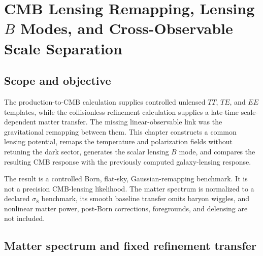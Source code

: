\chapter{CMB Lensing Remapping, Lensing \texorpdfstring{$B$}{B} Modes, and Cross-Observable Scale Separation}
\label{ch:cmb-lensing-remapping}

\section{Scope and objective}

The production-to-CMB calculation supplies controlled unlensed $TT$, $TE$, and $EE$ templates, while the collisionless refinement calculation supplies a late-time scale-dependent matter transfer.  The missing linear-observable link was the gravitational remapping between them.  This chapter constructs a common lensing potential, remaps the temperature and polarization fields without retuning the dark sector, generates the scalar lensing $B$ mode, and compares the resulting CMB response with the previously computed galaxy-lensing response.

The result is a controlled Born, flat-sky, Gaussian-remapping benchmark.  It is not a precision CMB-lensing likelihood.  The matter spectrum is normalized to a declared $\sigma_8$ benchmark, its smooth baseline transfer omits baryon wiggles, and nonlinear matter power, post-Born corrections, foregrounds, and delensing are not included.

\section{Matter spectrum and fixed refinement transfer}

